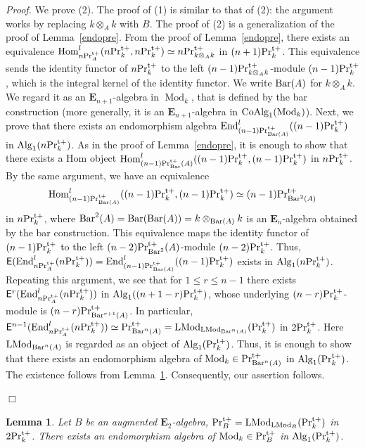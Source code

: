 \documentclass[leqno,12pt]{amsart}
\theoremstyle{plain}
\newtheorem{Lemma}[Theorem]{Lemma}
\theoremstyle{definition}
\newcommand{\PRTT}{\textup{Pr}^{\textup{t}+}}
\newcommand{\Hom}{\operatorname{Hom}}
\newcommand{\Mod}{\operatorname{Mod}}
\newcommand{\Alg}{\operatorname{Alg}}
\newcommand{\End}{\operatorname{End}}
\newcommand{\LMod}{\operatorname{LMod}}
\newcommand{\Proof}{{\sl Proof.}\quad}
\newcommand{\QED}{{\unskip\nobreak\hfil\penalty50\quad\null\nobreak\hfil
{$\Box$}\parfillskip0pt\finalhyphendemerits0\par\medskip}}
\begin{document}
\Proof
We prove (2). The proof of (1) is similar to that of (2): the argument works by replacing $k\otimes_Ak$ with $B$.
The proof of (2) is a generalization of the proof of Lemma~\ref{endopre}.
From the proof of Lemma~\ref{endopre}, there exists an equivalence
$\Hom_{n\PRTT_A}^l(n\PRTT_k,n\PRTT_k)\simeq n\PRTT_{k\otimes_Ak}$
in $(n+1)\PRTT_k$. This equivalence
sends the identity functor of $n\PRTT_k$ to the left $(n-1)\PRTT_{k\otimes_Ak}$-module $(n-1)\PRTT_{k}$,
which is the integral kernel of the identity functor.
We write $\textup{Bar}(A)$ for $k\otimes_Ak$. We regard it as an $\mathbf{E}_{n+1}$-algebra in $\Mod_k$, that is defined by
the bar construction (more generally, it is an $\mathbf{E}_{n+1}$-algebra in $\textup{CoAlg}_1(\Mod_k)$).
Next, we prove that there exists an endomorphism algebra
$\End_{(n-1)\PRTT_{\textup{Bar}(A)}}^l((n-1)\PRTT_k)$ in $\Alg_1(n\PRTT_k)$.
As in the proof of Lemma~\ref{endopre},
it is enough to show that there exists a Hom object
$\Hom_{(n-1)\PRTT_\textup{Bar}(A)}^l((n-1)\PRTT_k,(n-1)\PRTT_k)$
in $n\PRTT_k$.
By the same argument, 
we have an equivalence
\[
\Hom_{(n-1)\PRTT_{\textup{Bar}(A)}}^l((n-1)\PRTT_k,(n-1)\PRTT_k)\simeq (n-1)\PRTT_{\textup{Bar}^2(A)}
\]
in $n\PRTT_k$, where $\textup{Bar}^2(A)=\textup{Bar}(\textup{Bar}(A))=k\otimes_{\textup{Bar}(A)}k$ is an $\mathbf{E}_n$-algebra obtained by the bar construction.
This equivalence
maps the identity functor of $(n-1)\PRTT_k$ to the left $(n-2)\PRTT_{\textup{Bar}^2}(A)$-module $(n-2)\PRTT_{k}$.
Thus, $\mathsf{E}(\End_{n\PRTT_A}^l(n\PRTT_k))=\End_{(n-1)\PRTT_{\textup{Bar}(A)}}^l((n-1)\PRTT_k)$ exists in $\Alg_1(n\PRTT_k)$.
Repeating this argument, we see that for $1\le r\le n-1$ there exists 
$\mathsf{E}^r(\End_{n\PRTT_A}^l(n\PRTT_k))$ in $\Alg_1((n+1-r)\PRTT_k)$, whose underlying $(n-r)\PRTT_k$-module is 
$(n-r)\PRTT_{\textup{Bar}^{r+1}(A)}$.
In particular, 
$\mathsf{E}^{n-1}(\End_{n\PRTT_A}^l(n\PRTT_k))\simeq \PRTT_{\textup{Bar}^{n}(A)}=\LMod_{\LMod_{\textup{Bar}^{n}(A)}}(\PRTT_k)$ in $2\PRTT_k$.
Here $\LMod_{\textup{Bar}^{n}(A)}$ is regarded as an object of $\Alg_1(\PRTT_k)$.
Thus, it is enough to show that there exists an endomorphism algebra of $\Mod_k\in \PRTT_{\textup{Bar}^{n}(A)}$ in $\Alg_1(\PRTT_k)$.
The existence follows from Lemma~\ref{specialdegree}. 
Consequently, our assertion follows. 

\QED

\begin{Lemma}
\label{specialdegree}
Let $B$ be an augmented $\mathbf{E}_{2}$-algebra,
$\PRTT_B= \LMod_{\LMod_{B}}(\PRTT_k)$ in $2\PRTT_k$.
There exists an endomorphism algebra of $\Mod_k\in \PRTT_{B}$ in $\Alg_1(\PRTT_k)$.
\end{Lemma}
\end{document}
